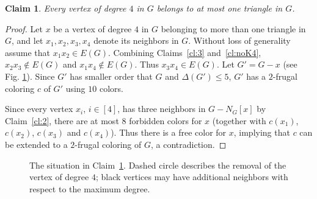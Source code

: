 \documentclass[10pt,a4paper]{article}
\newtheorem{claim}{Claim}
\begin{document}
\begin{claim} Every vertex of degree $4$ in $G$ belongs to at most one triangle in $G$.
\label{cl:4}
\end{claim} 
\begin{proof}
Let $x$ be a vertex of degree $4$ in $G$ belonging to more than one triangle in $G$, and let $x_1,x_2,x_3,x_4$ denote its neighbors in $G$. Without loss of generality assume that $x_1x_2\in E(G)$. Combining Claims~\ref{cl:3} and~\ref{cl:noK4}, $x_2x_3\not\in E(G)$ and $x_1x_4\not\in E(G)$. Thus $x_3x_4\in E(G)$. Let $G'=G-x$ (see Fig. \ref{fig:cl:4}). Since $G'$ has smaller order that $G$ and $\Delta(G')\le 5$, $G'$ has a $2$-frugal coloring $c$ of $G'$ using $10$ colors.

Since every vertex $x_i$, $i\in[4]$, has three neighbors in $G-N_G[x]$ by Claim~\ref{cl:2}, there are at most $8$ forbidden colors for $x$ (together with $c(x_1)$, $c(x_2)$, $c(x_3)$ and $c(x_4)$). Thus there is a free color for $x$, implying that $c$ can be extended to a $2$-frugal coloring of $G$, a contradiction.
\end{proof}


\begin{figure}[ht!]
\begin{center}

\caption{The situation in Claim~\ref{cl:4}. Dashed circle describes the removal of the vertex of degree $4$; black vertices may have additional neighbors with respect to the maximum degree. }\label{fig:cl:4}
\end{center}
\end{figure}
\end{document}

